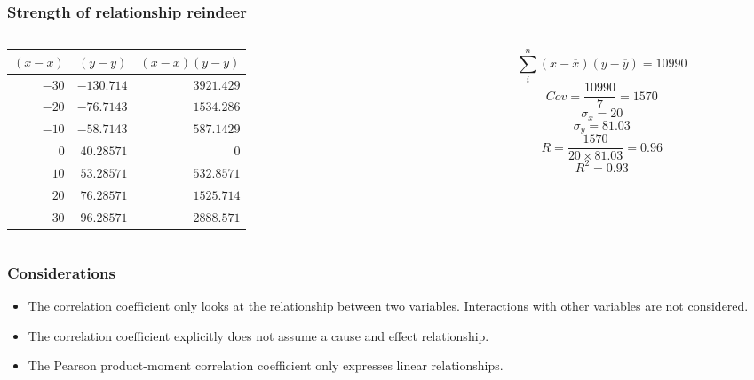 \documentclass[aspectratio=169]{beamer}
\begin{document}
\begin{frame}
  \frametitle{Strength of relationship reindeer}
  \begin{columns}
    \begin{column}{0.5\textwidth}
      \begin{table}[h] \centering \small
        \begin{tabular}{@{}rrr@{}} \toprule
          $(x-\overline{x})$ & $(y - \overline{y})$ & $(x-\overline{x})(y - \overline{y})$ \\
          \midrule
          $-30$ & $-130.714$ & $3921.429$ \\
          $-20$ & $-76.7143$ & $1534.286$ \\
          $-10$ & $-58.7143$ & $587.1429$\\
          $0$   & $40.28571$ & $0$\\
          $10$  & $53.28571$ & $532.8571$\\
          $20$  & $76.28571$ & $1525.714$\\
          $30$  & $96.28571$ & $2888.571$\\
          \bottomrule
        \end{tabular}
      \end{table}
    \end{column}
    \begin{column}{0.5\textwidth}
      \[ \sum_{i}^{n} (x-\overline{x})(y - \overline{y}) = 10990 \]
      \[ Cov = \frac{10990}{7} = 1570 \]
      \[ \sigma_{x} = 20 \]
      \[ \sigma_{y} = 81.03 \]
      \[ R = \frac{1570}{20 \times 81.03} = 0.96 \]
      \[ R^{2} = 0.93 \]
    \end{column}
  \end{columns}
\end{frame}

\begin{frame}
  \frametitle{Considerations}
  \begin{itemize}
    \item The correlation coefficient only looks at the relationship between two variables. Interactions with other variables are not considered.
    \item The correlation coefficient explicitly does not assume a cause and effect relationship.
    \item The Pearson product-moment correlation coefficient only expresses linear relationships.
  \end{itemize}
\end{frame}
\end{document}
